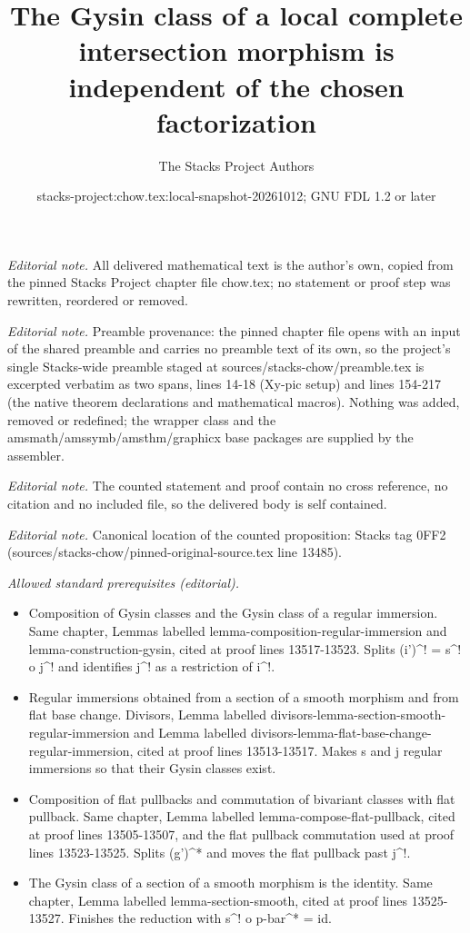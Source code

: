 \documentclass[10pt,a4paper]{amsart}
\title{The Gysin class of a local complete intersection morphism is independent of the chosen factorization}
\author{The Stacks Project Authors}
\date{stacks-project:chow.tex:local-snapshot-20261012; GNU FDL 1.2 or later}
\theoremstyle{plain}
\theoremstyle{definition}
\theoremstyle{remark}
\numberwithin{equation}{subsection}
\begin{document}
\maketitle
\noindent\textit{Editorial note.} All delivered mathematical text is the author's own, copied from the pinned Stacks Project chapter file chow.tex; no statement or proof step was rewritten, reordered or removed.\par\medskip
\noindent\textit{Editorial note.} Preamble provenance: the pinned chapter file opens with an input of the shared preamble and carries no preamble text of its own, so the project's single Stacks-wide preamble staged at sources/stacks-chow/preamble.tex is excerpted verbatim as two spans, lines 14-18 (Xy-pic setup) and lines 154-217 (the native theorem declarations and mathematical macros). Nothing was added, removed or redefined; the wrapper class and the amsmath/amssymb/amsthm/graphicx base packages are supplied by the assembler.\par\medskip
\noindent\textit{Editorial note.} The counted statement and proof contain no cross reference, no citation and no included file, so the delivered body is self contained.\par\medskip
\noindent\textit{Editorial note.} Canonical location of the counted proposition: Stacks tag 0FF2 (sources/stacks-chow/pinned-original-source.tex line 13485).\par\medskip
\noindent\textit{Allowed standard prerequisites (editorial).}\begin{itemize}
\item Composition of Gysin classes and the Gysin class of a regular immersion. Same chapter, Lemmas labelled lemma-composition-regular-immersion and lemma-construction-gysin, cited at proof lines 13517-13523. Splits (i')\textasciicircum{}! = s\textasciicircum{}! o j\textasciicircum{}! and identifies j\textasciicircum{}! as a restriction of i\textasciicircum{}!.
\item Regular immersions obtained from a section of a smooth morphism and from flat base change. Divisors, Lemma labelled divisors-lemma-section-smooth-regular-immersion and Lemma labelled divisors-lemma-flat-base-change-regular-immersion, cited at proof lines 13513-13517. Makes s and j regular immersions so that their Gysin classes exist.
\item Composition of flat pullbacks and commutation of bivariant classes with flat pullback. Same chapter, Lemma labelled lemma-compose-flat-pullback, cited at proof lines 13505-13507, and the flat pullback commutation used at proof lines 13523-13525. Splits (g')\textasciicircum{}* and moves the flat pullback past j\textasciicircum{}!.
\item The Gysin class of a section of a smooth morphism is the identity. Same chapter, Lemma labelled lemma-section-smooth, cited at proof lines 13525-13527. Finishes the reduction with s\textasciicircum{}! o p-bar\textasciicircum{}* = id.
\end{itemize}\medskip
\end{document}

